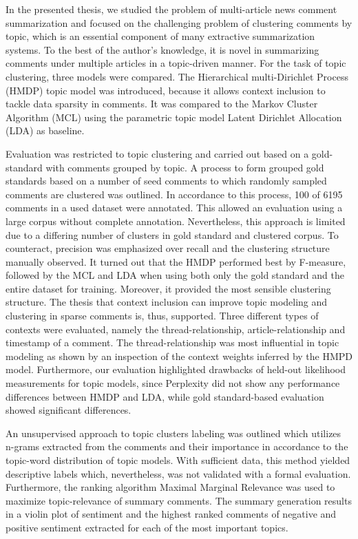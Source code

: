 In the presented thesis, we studied the problem of multi-article news comment summarization and focused on the challenging problem of clustering comments by topic, which is an essential component of many extractive summarization systems. To the best of the author's knowledge, it is novel in summarizing comments under multiple articles in a topic-driven manner. For the task of topic clustering, three models were compared. The Hierarchical multi-Dirichlet Process (HMDP) topic model was introduced, because it allows context inclusion to tackle data sparsity in comments. It was compared to the Markov Cluster Algorithm (MCL) using the parametric topic model Latent Dirichlet Allocation (LDA) as baseline. \par
Evaluation was restricted to topic clustering and carried out based on a gold-standard with comments grouped by topic. A process to form grouped gold standards based on a number of seed comments to which randomly sampled comments are clustered was outlined. In accordance to this process, 100 of 6195 comments in a used dataset were annotated. This allowed an evaluation using a large corpus without complete annotation. Nevertheless, this approach is limited due to a differing number of clusters in gold standard and clustered corpus. To counteract, precision was emphasized over recall and the clustering structure manually observed. It turned out that the HMDP performed best by F-measure, followed by the MCL and LDA when using both only the gold standard and the entire dataset for training. Moreover, it provided the most sensible clustering structure. The thesis that context inclusion can improve topic modeling and clustering in sparse comments is, thus, supported. Three different types of contexts were evaluated, namely the thread-relationship, article-relationship and timestamp of a comment.
The thread-relationship was most influential in topic modeling as shown by an inspection of the context weights inferred by the HMPD model. Furthermore, our evaluation highlighted drawbacks of held-out likelihood measurements for topic models, since Perplexity did not show any performance differences between HMDP and LDA, while gold standard-based evaluation showed significant differences. \par
An unsupervised approach to topic clusters labeling was outlined which utilizes n-grams extracted from the comments and their importance in accordance to the topic-word distribution of topic models. With sufficient data, this method yielded descriptive labels which, nevertheless, was not validated with a formal evaluation. Furthermore, the ranking algorithm Maximal Marginal Relevance was used to maximize topic-relevance of summary comments. The summary generation results in a violin plot of sentiment and the highest ranked comments of negative and positive sentiment extracted for each of the most important topics. \par

